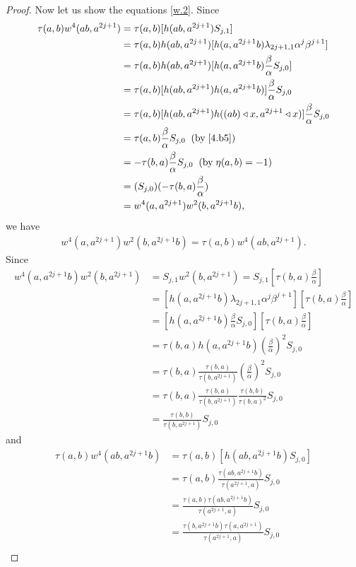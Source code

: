 \documentclass[a4paper,11pt]{amsart}
\numberwithin{equation}{section}
\begin{document}
\begin{proof}
Now let us show the equations \eqref{w.2}. Since
\begin{align*}
\tau(a,b) w^4(ab,a^{2j+1})&=\tau(a,b) [h(ab,a^{2j+1})S_{j,1}]\\
&=\tau(a,b) h(ab,a^{2j+1}) [h(a,a^{2j+1}b) \lambda_{2j+1,1} \alpha^j \beta^{j+1}]\\
&=\tau(a,b) h(ab,a^{2j+1}) [h(a,a^{2j+1}b) \frac{\beta}{\alpha} S_{j,0}]\\
&=\tau(a,b) [h(ab,a^{2j+1}) h(a,a^{2j+1}b)] \frac{\beta}{\alpha} S_{j,0}\\
&=\tau(a,b) [h(ab,a^{2j+1}) h((ab)\triangleleft x,a^{2j+1}\triangleleft x)] \frac{\beta}{\alpha} S_{j,0} \\
&=\tau(a,b) \frac{\beta}{\alpha} S_{j,0} \;\;(\text{by}\;\eqref{4.b5})\\
&=-\tau(b,a) \frac{\beta}{\alpha} S_{j,0}\;\;(\text{by} \;\eta(a,b)=-1)\\
&=(S_{j,0}) (-\tau(b,a) \frac{\beta}{\alpha})\\
&=w^4(a,a^{2j+1}) w^2(b,a^{2j+1}b),
\end{align*}
we have
\begin{align}
\label{w4.1.1} w^4(a,a^{2j+1}) w^2(b,a^{2j+1}b)=\tau(a,b) w^4(ab,a^{2j+1}).
\end{align}
Since
\begin{align*}
w^4(a,a^{2j+1}b) w^2(b,a^{2j+1})&=S_{j,1} w^2(b,a^{2j+1})=S_{j,1}[\tau(b,a)\frac{\beta}{\alpha}] \\
&=[h(a,a^{2j+1}b) \lambda_{2j+1,1} \alpha^j \beta^{j+1}] [\tau(b,a)\frac{\beta}{\alpha}]\\
&=[h(a,a^{2j+1}b) \frac{\beta}{\alpha} S_{j,0}] [\tau(b,a)\frac{\beta}{\alpha}]\\
&=\tau(b,a) h(a,a^{2j+1}b) (\frac{\beta}{\alpha})^2 S_{j,0}\\
&=\tau(b,a) \frac{\tau(b,a)}{\tau(b,a^{2j+1})} (\frac{\beta}{\alpha})^2 S_{j,0}\\
&=\tau(b,a) \frac{\tau(b,a)}{\tau(b,a^{2j+1})} \frac{\tau(b,b)}{\tau(b,a)^2} S_{j,0}\\
&=\frac{\tau(b,b)}{\tau(b,a^{2j+1})}  S_{j,0}
\end{align*}
and
\begin{align*}
\tau(a,b) w^4(ab,a^{2j+1}b)&=\tau(a,b)[h(ab,a^{2j+1}b) S_{j,0}]\\
&=\tau(a,b) \frac{\tau(ab,a^{2j+1}b)}{\tau(a^{2j+1},a)} S_{j,0}  \\
&=\frac{\tau(a,b) \tau(ab,a^{2j+1}b)}{\tau(a^{2j+1},a)} S_{j,0}\\
&=\frac{\tau(b,a^{2j+1}b) \tau(a,a^{2j+1})}{\tau(a^{2j+1},a)} S_{j,0}\\

\end{align*}
\end{proof}
\end{document}
